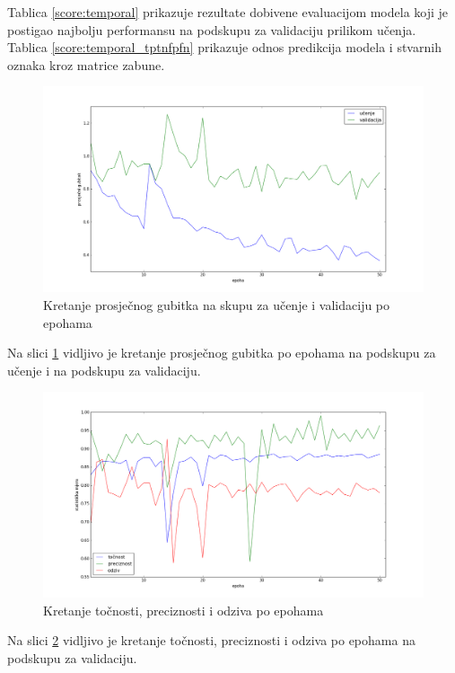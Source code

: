 \documentclass[times, utf8, diplomski, numeric]{fer}
\begin{document}
\noindent Tablica \ref{score:temporal} prikazuje rezultate dobivene evaluacijom modela koji je postigao najbolju performansu na podskupu za validaciju prilikom učenja.
Tablica \ref{score:temporal_tptnfpfn} prikazuje odnos predikcija modela i stvarnih oznaka kroz matrice zabune.

\begin{figure}[H]
\centering
\includegraphics[scale=0.35]{images/temporal_loss.png}
\caption{Kretanje prosječnog gubitka na skupu za učenje i validaciju po epohama}
\label{img:temporal_loss}
\end{figure}
\noindent Na slici \ref{img:temporal_loss} vidljivo je kretanje prosječnog gubitka po epohama na podskupu za učenje i na podskupu za validaciju.

\begin{figure}[H]
\centering
\includegraphics[scale=0.35]{images/temporal_ac_ap.png}
\caption{Kretanje točnosti, preciznosti i odziva po epohama}
\label{img:temporal_ac_ap}
\end{figure}
\noindent Na slici \ref{img:temporal_ac_ap} vidljivo je kretanje točnosti, preciznosti i odziva po epohama na podskupu za validaciju.
\end{document}
